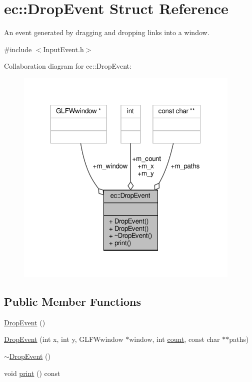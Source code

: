 \hypertarget{structec_1_1_drop_event}{}\section{ec\+:\+:Drop\+Event Struct Reference}
\label{structec_1_1_drop_event}


An event generated by dragging and dropping links into a window.  




{\ttfamily \#include $<$Input\+Event.\+h$>$}



Collaboration diagram for ec\+:\+:Drop\+Event\+:\nopagebreak
\begin{figure}[H]
\begin{center}
\leavevmode
\includegraphics[width=305pt]{structec_1_1_drop_event__coll__graph}
\end{center}
\end{figure}
\subsection*{Public Member Functions}
\begin{DoxyCompactItemize}
\item 
\mbox{\hyperlink{structec_1_1_drop_event_a6ae6f5be022c3809bc204c365dc11cbc}{Drop\+Event}} ()
\item 
\mbox{\hyperlink{structec_1_1_drop_event_a955d74612461f4100890101ddd1c2528}{Drop\+Event}} (int x, int y, G\+L\+F\+Wwindow $\ast$window, int \mbox{\hyperlink{namespaceec_a30e2a743ebdeb02ac68a6cfa50f629c7ae2942a04780e223b215eb8b663cf5353}{count}}, const char $\ast$$\ast$paths)
\item 
\mbox{\hyperlink{structec_1_1_drop_event_ad68bca5b7ca0c65690fc85d682d057db}{$\sim$\+Drop\+Event}} ()
\item 
void \mbox{\hyperlink{structec_1_1_drop_event_a6cda7eaf944e0b94f49a8523c7da2656}{print}} () const
\end{DoxyCompactItemize}
